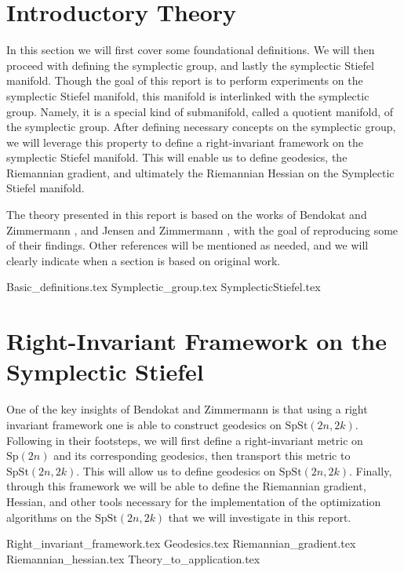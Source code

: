 \section{Introductory Theory}\label{sec:Introductory_theory}
In this section we will first cover some foundational definitions. We will then proceed with defining the symplectic group, and lastly the symplectic Stiefel manifold. Though the goal of this report is to perform experiments on the symplectic Stiefel manifold, this manifold is interlinked with the symplectic group. Namely, it is a special kind of submanifold, called a quotient manifold, of the symplectic group. After defining necessary concepts on the symplectic group, we will leverage this property to define a right-invariant framework on the symplectic Stiefel manifold. This will enable us to define geodesics, the Riemannian gradient, and ultimately the Riemannian Hessian on the Symplectic Stiefel manifold. 

The theory presented in this report is based on the works of Bendokat and Zimmermann \cite{BendokatZimmermann2021}, and Jensen and Zimmermann \cite{JensenZimmermann2024}, with the goal of reproducing some of their findings. Other references will be mentioned as needed, and we will clearly indicate when a section is based on original work. 

{Basic_definitions.tex}
{Symplectic_group.tex}
{SymplecticStiefel.tex}

\section{Right-Invariant Framework on the Symplectic Stiefel}\label{sec:right_invariant_framework}
One of the key insights of Bendokat and Zimmermann \cite[p.~11]{BendokatZimmermann2021} is that using a right invariant framework one is able to construct geodesics on $\mathrm{SpSt}(2n, 2k)$. Following in their footsteps, we will first define a right-invariant metric on $\mathrm{Sp}(2n)$ and its corresponding geodesics, then transport this metric to $\mathrm{SpSt}(2n, 2k)$. This will allow us to define geodesics on $\mathrm{SpSt}(2n, 2k)$. Finally, through this framework we will be able to define the Riemannian gradient, Hessian, and other tools necessary for the implementation of the optimization algorithms on the $\mathrm{SpSt}(2n, 2k)$ that we will investigate in this report. 

{Right_invariant_framework.tex}
{Geodesics.tex}
{Riemannian_gradient.tex}
{Riemannian_hessian.tex}
{Theory_to_application.tex}
